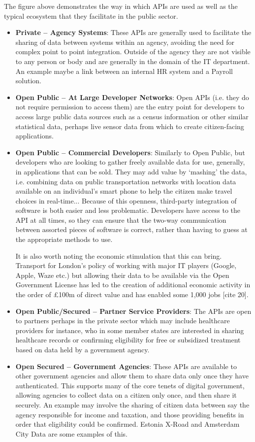 The figure above demonstrates the way in which APIs are used as well as the typical
ecosystem that they facilitate in the public sector.
\begin{itemize}
	\item \textbf{Private – Agency Systems}: These APIs are generally used to facilitate
	 the sharing of data between systems within an agency, avoiding the need
	 for complex point to point integration. Outside of the agency they are not visible
	 to any person or body and are generally in the domain of the IT
	 department. An example maybe a link between an internal HR system and a
	 Payroll solution.
	 \item \textbf{Open Public – At Large Developer Networks}: Open APIs (i.e. they do
	 not require permission to access them) are the entry point for developers
	 to access large public data sources such as a census information or other
	 similar statistical data, perhaps live sensor data from which to create
	 citizen-facing applications.
	 \item \textbf{Open Public – Commercial Developers}: Similarly to Open Public,
	 but developers who are
	 looking to gather freely available data for use, generally, in applications
	 that can be sold. They may add value by ‘mashing’ the data, i.e. combining
	 data on public transportation networks with location data available on an
	 individual’s smart phone to help the citizen make travel choices in real-time...
	 Because of this openness, third-party integration of software is  both easier
	 and less problematic. Developers have access to the API at all times, so they
	 can ensure that the two-way communication between assorted pieces of software
	 is correct, rather than having to guess at the appropriate methods to use.
	 
	 It is also worth noting the economic stimulation that this can bring. Transport
	 for London’s policy of working with major IT players (Google, Apple, Waze etc.)
	 but allowing their data to be available via the Open Government License has led
	 to the creation of additional economic activity in the order of £100m of direct
	 value and has enabled some 1,000 jobs [cite 20].
	 \item \textbf{Open Public/Secured – Partner Service Providers}: The APIs are open to
	 partners perhaps in the private sector which may include healthcare providers
	 for instance, who in some member states are interested in sharing healthcare
	 records or confirming eligibility for free or subsidized treatment based on
	 data held by a government agency.
	 \item \textbf{Open Secured – Government Agencies}: These APIs are available to other
	 government agencies and allow them to share data only once they have
	 authenticated. This supports many of the core tenets of digital government,
	 allowing agencies to collect data on a citizen only once, and then share it
	 securely. An example may involve the sharing of citizen data between say the
	 agency responsible for income and taxation, and those providing benefits in
	 order that eligibility could be confirmed. Estonia X-Road and Amsterdam City
	 Data are some examples of this.
	 

\end{itemize}
